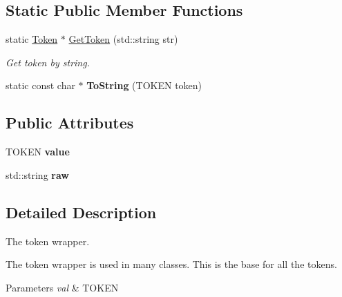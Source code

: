 \subsection*{Static Public Member Functions}
\begin{DoxyCompactItemize}
\item 
static \hyperlink{class_cobra_1_1internal_1_1_token}{Token} $\ast$ \hyperlink{class_cobra_1_1internal_1_1_token_a724ca96f5ae2bd83331e6fc52dc5e3ef}{Get\+Token} (std\+::string str)
\begin{DoxyCompactList}\small\item\em Get token by string. \end{DoxyCompactList}\item 
\hypertarget{class_cobra_1_1internal_1_1_token_a6d0c35c7163cf921aadae357263b449f}{static const char $\ast$ {\bfseries To\+String} (T\+O\+K\+E\+N token)}\label{class_cobra_1_1internal_1_1_token_a6d0c35c7163cf921aadae357263b449f}

\end{DoxyCompactItemize}
\subsection*{Public Attributes}
\begin{DoxyCompactItemize}
\item 
\hypertarget{class_cobra_1_1internal_1_1_token_adcd2e429ed43b744ab9dd16450408570}{T\+O\+K\+E\+N {\bfseries value}}\label{class_cobra_1_1internal_1_1_token_adcd2e429ed43b744ab9dd16450408570}

\item 
\hypertarget{class_cobra_1_1internal_1_1_token_a7a9397cc323fa7f28fa49783977eb32b}{std\+::string {\bfseries raw}}\label{class_cobra_1_1internal_1_1_token_a7a9397cc323fa7f28fa49783977eb32b}

\end{DoxyCompactItemize}


\subsection{Detailed Description}
The token wrapper. 

The token wrapper is used in many classes. This is the base for all the tokens.


\begin{DoxyParams}{Parameters}
{\em val} & T\+O\+K\+E\+N \\
\hline
\end{DoxyParams}



